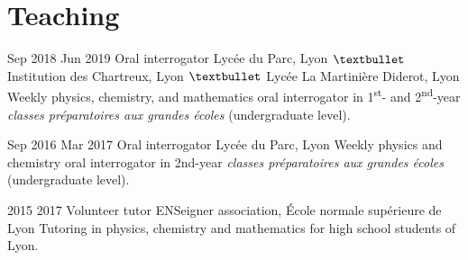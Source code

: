 \documentclass[letterpaper]{cvtemplate_en} %
\begin{document}
\section{Teaching}
\begin{cvbody}

\cvitem
	{Sep 2018}
	{Jun 2019}
	{Oral interrogator}
	{Lyc\'ee du Parc, Lyon $\textbullet$ Institution des Chartreux, Lyon $\textbullet$ Lyc\'ee La Martinière Diderot, Lyon }
	{}{}{}
	{}
	{Weekly physics, chemistry, and mathematics oral interrogator in 1\textsuperscript{st}- and 2\textsuperscript{nd}-year \textit{classes pr\'eparatoires aux grandes \'ecoles} (undergraduate level).\\}

\cvitem
	{Sep 2016}
	{Mar 2017}
	{Oral interrogator}
	{Lyc\'ee du Parc, Lyon }
	{}{}{}
	{}
	{Weekly physics and chemistry oral interrogator in 2nd-year \textit{classes pr\'eparatoires aux grandes \'ecoles} (undergraduate level).\\}

\cvitem
	{2015}
	{2017}
	{Volunteer tutor}
	{ENSeigner association, \'Ecole normale sup\'erieure de Lyon }
	{}{}{}
	{}
	{Tutoring in physics, chemistry and mathematics for high school students of Lyon.}

\end{cvbody}
\end{document}
